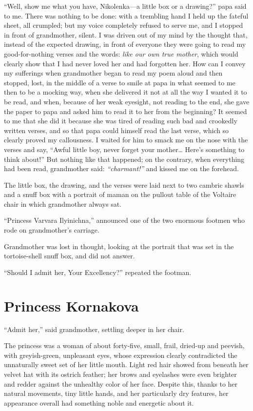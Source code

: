 ``Well, show me what you have, Nikolenka---a little box or a drawing?'' papa said to me. There was nothing to be done: with a trembling hand I held up the fateful sheet, all crumpled; but my voice completely refused to serve me, and I stopped in front of grandmother, silent. I was driven out of my mind by the thought that, instead of the expected drawing, in front of everyone they were going to read my good-for-nothing verses and the words: \textit{like our own true mother}, which would clearly show that I had never loved her and had forgotten her. How can I convey my sufferings when grandmother began to read my poem aloud and then stopped, lost, in the middle of a verse to smile at papa in what seemed to me then to be a mocking way, when she delivered it not at all the way I wanted it to be read, and when, because of her weak eyesight, not reading to the end, she gave the paper to papa and asked him to read it to her from the beginning? It seemed to me that she did it because she was tired of reading such bad and crookedly written verses, and so that papa could himself read the last verse, which so clearly proved my callousness. I waited for him to smack me on the nose with the verses and say, ``Awful little boy, never forget your mother\ldots{} Here's something to think about!'' But nothing like that happened; on the contrary, when everything had been read, grandmother said: \textit{``charmant!''} and kissed me on the forehead. %

The little box, the drawing, and the verses were laid next to two cambric shawls and a snuff box with a portrait of maman on the pullout table of the Voltaire chair in which grandmother always sat.

``Princess Varvara Ilyinichna,'' announced one of the two enormous footmen who rode on grandmother's carriage. %

Grandmother was lost in thought, looking at the portrait that was set in the tortoise-shell snuff box, and did not answer.

``Should I admit her, Your Excellency?'' repeated the footman.

\chapter{Princess Kornakova} %

``Admit her,'' said grandmother, settling deeper in her chair.

The princess was a woman of about forty-five, small, frail, dried-up and peevish, with greyish-green, unpleasant eyes, whose expression clearly contradicted the unnaturally sweet set of her little mouth. Light red hair showed from beneath her velvet hat with its ostrich feather; her brows and eyelashes were even brighter and redder against the unhealthy color of her face. Despite this, thanks to her natural movements, tiny little hands, and her particularly dry features, her appearance overall had something noble and energetic about it.

